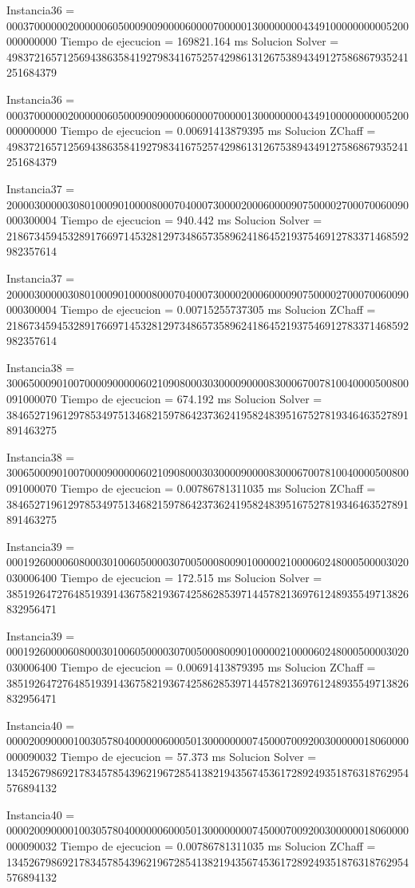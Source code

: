 Instancia36 = 000370000002000000605000900900006000070000013000000004349100000000005200000000000
Tiempo de ejecucion = 169821.164 ms
Solucion Solver = 498372165712569438635841927983416752574298613126753894349127586867935241251684379

Instancia36 = 000370000002000000605000900900006000070000013000000004349100000000005200000000000
Tiempo de ejecucion = 0.00691413879395 ms
Solucion ZChaff = 498372165712569438635841927983416752574298613126753894349127586867935241251684379

Instancia37 = 200003000003080100090100008000704000730000200060000907500002700070060090000300004
Tiempo de ejecucion = 940.442 ms
Solucion Solver = 218673459453289176697145328129734865735896241864521937546912783371468592982357614

Instancia37 = 200003000003080100090100008000704000730000200060000907500002700070060090000300004
Tiempo de ejecucion = 0.00715255737305 ms
Solucion ZChaff = 218673459453289176697145328129734865735896241864521937546912783371468592982357614

Instancia38 = 300650009010070000900000602109080003030000900008300067007810040000500800091000070
Tiempo de ejecucion = 674.192 ms
Solucion Solver = 384652719612978534975134682159786423736241958248395167527819346463527891891463275

Instancia38 = 300650009010070000900000602109080003030000900008300067007810040000500800091000070
Tiempo de ejecucion = 0.00786781311035 ms
Solucion ZChaff = 384652719612978534975134682159786423736241958248395167527819346463527891891463275

Instancia39 = 000192600006080003010060500003070050008009010000021000060248000500003020030006400
Tiempo de ejecucion = 172.515 ms
Solucion Solver = 385192647276485193914367582193674258628539714457821369761248935549713826832956471

Instancia39 = 000192600006080003010060500003070050008009010000021000060248000500003020030006400
Tiempo de ejecucion = 0.00691413879395 ms
Solucion ZChaff = 385192647276485193914367582193674258628539714457821369761248935549713826832956471

Instancia40 = 000020090000100305780400000060005013000000007450007009200300000018060000000090032
Tiempo de ejecucion = 57.373 ms
Solucion Solver = 134526798692178345785439621967285413821943567453617289249351876318762954576894132

Instancia40 = 000020090000100305780400000060005013000000007450007009200300000018060000000090032
Tiempo de ejecucion = 0.00786781311035 ms
Solucion ZChaff = 134526798692178345785439621967285413821943567453617289249351876318762954576894132

